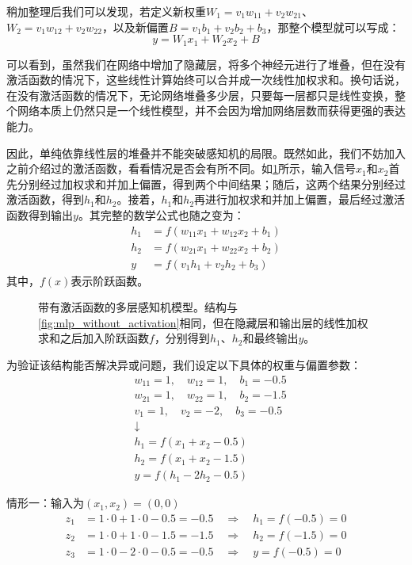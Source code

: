 稍加整理后我们可以发现，若定义新权重$W_1 = v_1w_{11} + v_2w_{21}$、 $W_2 = v_1w_{12} + v_2w_{22}$，以及新偏置$B = v_1b_1 + v_2b_2 + b_3$，那整个模型就可以写成：
$$
y = W_1 x_1 + W_2 x_2 + B
$$

可以看到，虽然我们在网络中增加了隐藏层，将多个神经元进行了堆叠，但在没有激活函数的情况下，这些线性计算始终可以合并成一次线性加权求和。换句话说，在没有激活函数的情况下，无论网络堆叠多少层，只要每一层都只是线性变换，整个网络本质上仍然只是一个线性模型，并不会因为增加网络层数而获得更强的表达能力。

因此，单纯依靠线性层的堆叠并不能突破感知机的局限。既然如此，我们不妨加入之前介绍过的激活函数，看看情况是否会有所不同。如\cref{fig:mlp_with_activation}所示，输入信号$x_1$和$x_2$首先分别经过加权求和并加上偏置，得到两个中间结果；随后，这两个结果分别经过激活函数，得到$h_1$和$h_2$。接着，$h_1$和$h_2$再进行加权求和并加上偏置，最后经过激活函数得到输出$y$。其完整的数学公式也随之变为：
\begin{align*}
    h_1&=f(w_{11}x_1+w_{12}x_2+b_1)\\
    h_2&=f(w_{21}x_1+w_{22}x_2+b_2)\\
    y&=f(v_1h_1+v_2h_2+b_3)
\end{align*}
其中，$f(x)$表示阶跃函数。

\begin{figure}[H]
    \caption{带有激活函数的多层感知机模型。结构与\cref{fig:mlp_without_activation}相同，但在隐藏层和输出层的线性加权求和之后加入阶跃函数$f$，分别得到$h_1$、$h_2$和最终输出$y$。}
    \label{fig:mlp_with_activation}
\end{figure}

为验证该结构能否解决异或问题，我们设定以下具体的权重与偏置参数：
\begin{align*}
    & w_{11}=1,\quad w_{12}=1,\quad b_1=-0.5 \\
    & w_{21}=1,\quad w_{22}=1,\quad b_2=-1.5 \\
    & v_1=1,\quad v_2=-2,\quad b_3=-0.5 \\
    & \downarrow \\
    & h_1=f(x_1+x_2-0.5) \\
    & h_2=f(x_1+x_2-1.5) \\
    & y=f(h_1-2h_2-0.5)
\end{align*}

情形一：输入为$(x_1,x_2)=(0,0)$
\begin{align*}
    z_1 &= 1\cdot0 + 1\cdot0 - 0.5 = -0.5 \quad\Rightarrow\quad h_1 = f(-0.5) = 0 \\
    z_2 &= 1\cdot0 + 1\cdot0 - 1.5 = -1.5 \quad\Rightarrow\quad h_2 = f(-1.5) = 0 \\
    z_3 &= 1\cdot0 - 2\cdot0 - 0.5 = -0.5 \quad\Rightarrow\quad y = f(-0.5) = 0
\end{align*}

